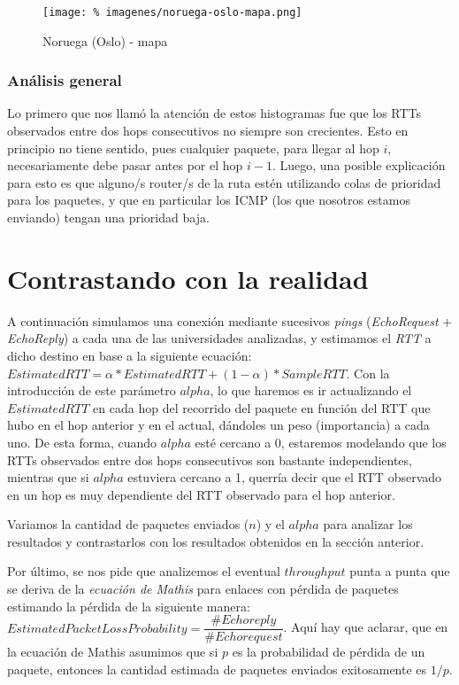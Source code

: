 \documentclass[final,inline,a4paper,narroweqnarray]{ieee}
\let\Oldsection\section
\renewcommand{\section}{\FloatBarrier\Oldsection}
\let\Oldsubsubsection\subsubsection
\renewcommand{\subsubsection}{\FloatBarrier\Oldsubsubsection}
\begin{document}
\begin{figure}[ht]\begin{center}
   \texttt{[image: \%
    imagenes/noruega-oslo-mapa.png]}
    \caption{Noruega (Oslo) - mapa}
    \label{Noruega}
\end{center}\end{figure}

\subsubsection{Análisis general}
Lo primero que nos llamó la atención de estos histogramas fue que los RTTs observados entre dos
hops consecutivos no siempre son crecientes. Esto en principio no tiene sentido, pues cualquier
paquete, para llegar al hop $i$, necesariamente debe pasar antes por el hop $i-1$. Luego,
una posible explicación para esto es que alguno/s router/s de la ruta estén utilizando colas
de prioridad para los paquetes, y que en particular los ICMP (los que nosotros estamos enviando)
tengan una prioridad baja.

\section{Contrastando con la realidad}
A continuación simulamos una conexión mediante sucesivos \emph{pings} (\emph{EchoRequest} $+$
\emph{EchoReply})
a cada una de las universidades analizadas, y estimamos el \emph{RTT} a dicho destino
en base a la siguiente ecuación:
$ EstimatedRTT = \alpha * EstimatedRTT + (1 - \alpha) * SampleRTT $. Con la introducción de
este parámetro $alpha$, lo que haremos es ir actualizando el $EstimatedRTT$ en cada hop del
recorrido del paquete en función del RTT que hubo en el hop anterior y en el actual, dándoles
un peso (importancia) a cada uno. De esta forma, cuando $alpha$ esté cercano a 0, estaremos
modelando que los RTTs observados entre dos hops consecutivos son bastante independientes,
mientras que si $alpha$ estuviera cercano a 1, querría decir que el RTT observado en un
hop es muy dependiente del RTT observado para el hop anterior.

Variamos la cantidad de paquetes enviados ($n$) y el $alpha$ para analizar los resultados
y contrastarlos con los resultados obtenidos en la sección anterior.

Por último, se nos pide que analizemos el eventual $throughput$ punta a punta que se deriva de la
\emph{ecuación de Mathis} para enlaces con pérdida de paquetes estimando la pérdida de la
siguiente manera:
$EstimatedPacketLossProbability = \dfrac{\#Echo reply}{\#Echo request}$. Aquí hay que aclarar,
que en la ecuación de Mathis asumimos que si $p$ es la probabilidad de pérdida de un paquete,
entonces la cantidad estimada de paquetes enviados exitosamente es $1/p$.
\end{document}
